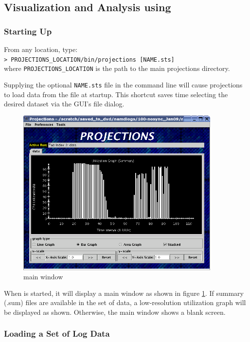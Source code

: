 \documentclass[10pt]{article}
\begin{document}
\subsection{Visualization and Analysis using \projections{}}

\subsubsection{Starting Up}

From any location, type: \\
{\tt > PROJECTIONS\_LOCATION/bin/projections [NAME.sts]} \\
where {\tt PROJECTIONS\_LOCATION} is the path to the main projections
directory.

Supplying the optional {\tt NAME.sts} file in the command line will
cause projections to load data from the file at startup. This shortcut
saves time selecting the desired dataset via the GUI's file dialog.

\begin{figure}[hbt]
\center
\includegraphics[width=4.0in]{fig/front-with-summary}
\caption{\projections{} main window}
\label{mainwindow}
\end{figure}


When \projections{} is started, it will display a main window as shown
in figure \ref{mainwindow}. If summary (.sum) files are available in
the set of data, a low-resolution utilization graph will be displayed
as shown. Otherwise, the main window shows a blank screen.

\subsubsection{Loading a Set of Log Data}
\end{document}
